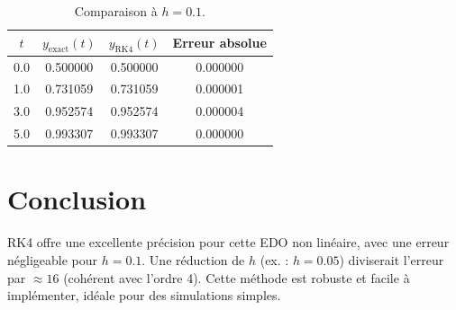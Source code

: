 \documentclass[12pt,a4paper]{article}
\begin{document}
\begin{table}[h]
\centering
\begin{tabular}{cccc}
\toprule
$t$ & $y_{\text{exact}}(t)$ & $y_{\text{RK4}}(t)$ & Erreur absolue \\
\midrule
0.0 & 0.500000 & 0.500000 & 0.000000 \\
1.0 & 0.731059 & 0.731059 & 0.000001 \\
3.0 & 0.952574 & 0.952574 & 0.000004 \\
5.0 & 0.993307 & 0.993307 & 0.000000 \\
\bottomrule
\end{tabular}
\caption{Comparaison à $h=0.1$.}
\end{table}

\section{Conclusion}
RK4 offre une excellente précision pour cette EDO non linéaire, avec une erreur négligeable pour $h=0.1$. Une réduction de $h$ (ex. : $h=0.05$) diviserait l'erreur par $\approx 16$ (cohérent avec l'ordre 4). Cette méthode est robuste et facile à implémenter, idéale pour des simulations simples.



\end{document}
